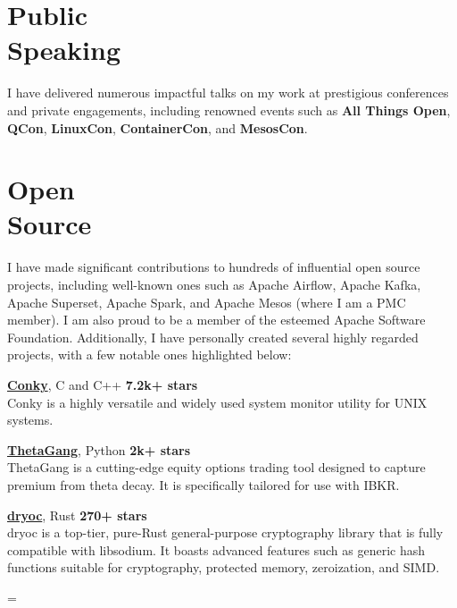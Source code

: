 \documentclass[margin,line]{resume}
\newenvironment{absolutelynopagebreak}
{\par\nobreak\vfil\penalty0\vfilneg
\vtop\bgroup}
{\par\xdef\tpd{\the\prevdepth}\egroup
\prevdepth=\tpd}
\begin{document}
\begin{resume}
\vspace{3mm}

\section{\mysidestyle Public\\Speaking}

I have delivered numerous impactful talks on my work at prestigious conferences and private engagements, including renowned events such as \textbf{All Things Open}, \textbf{QCon}, \textbf{LinuxCon}, \textbf{ContainerCon}, and \textbf{MesosCon}.

\vspace{3mm}

\section{\mysidestyle Open\\Source}

I have made significant contributions to hundreds of influential open source projects, including well-known ones such as Apache Airflow, Apache Kafka, Apache Superset, Apache Spark, and Apache Mesos (where I am a PMC member). I am also proud to be a member of the esteemed Apache Software Foundation. Additionally, I have personally created several highly regarded projects, with a few notable ones highlighted below:

\href{https://github.com/brndnmtthws/conky}{\textbf{Conky}}, C and C++ \hfill \textbf{7.2k+ stars}\\
Conky is a highly versatile and widely used system monitor utility for UNIX systems.

\href{https://github.com/brndnmtthws/thetagang}{\textbf{ThetaGang}}, Python \hfill \textbf{2k+ stars}\\
ThetaGang is a cutting-edge equity options trading tool designed to capture premium from theta decay. It is specifically tailored for use with IBKR.

\href{https://github.com/brndnmtthws/dryoc}{\textbf{dryoc}}, Rust \hfill \textbf{270+ stars}\\
dryoc is a top-tier, pure-Rust general-purpose cryptography library that is fully compatible with libsodium. It boasts advanced features such as generic hash functions suitable for cryptography, protected memory, zeroization, and SIMD.

\vspace{3mm}

\begin{absolutelynopagebreak}

\end{absolutelynopagebreak}
\end{resume}
\end{document}
